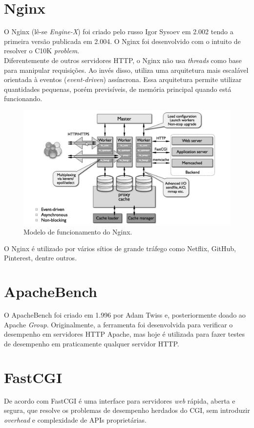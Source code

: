 \section{Nginx}
O Nginx (lê-se \textit{Engine-X}) foi criado pelo russo Igor Sysoev em 2.002 
tendo a primeira versão publicada em 2.004. O Nginx foi desenvolvido com o 
intuito de resolver o C10K \textit{problem}.\\
Diferentemente de outros servidores HTTP, o Nginx não usa \textit{threads} como 
base para manipular requisições. Ao invés disso, utiliza uma arquitetura mais 
escalável orientada à eventos (\textit{event-driven}) assíncrona. Essa 
arquitetura permite utilizar quantidades pequenas, porém previsíveis, de 
memória principal quando está funcionando.\\
\begin{figure}[h!]
\centering
\includegraphics[scale=1]{figuras/nginx-how-it-works} 
\caption{Modelo de funcionamento do Nginx.}
\label{fig:nginx-comofunciona}
\end{figure}
O Nginx é utilizado por vários sítios de grande tráfego como Netflix, GitHub, 
Pinterest, dentre outros.\\
\section{ApacheBench}
O ApacheBench foi criado em 1.996 por Adam Twiss e, posteriormente doado ao 
Apache \textit{Group}. Originalmente, a ferramenta foi desenvolvida para 
verificar o desempenho em servidores HTTP Apache, mas hoje é utilizada para 
fazer testes de desempenho em  praticamente qualquer servidor HTTP.
\section{FastCGI}
De acordo com  FastCGI é uma interface para servidores 
\textit{web} rápida, aberta e segura, que resolve os problemas de desempenho 
herdados do CGI, sem introduzir \textit{overhead} e complexidade de APIs 
proprietárias.
